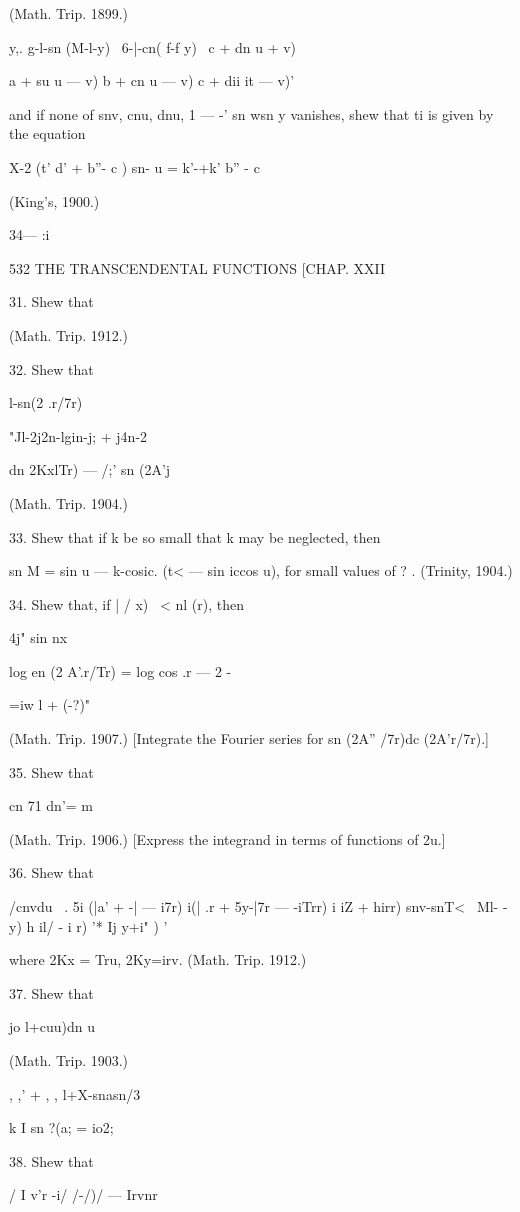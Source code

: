 (Math. Trip. 1899.)

y,. g-l-sn (M-l-y) \ 6-|-cn( f-f y) \ c + dn u + v)

a + su u — v) b + cn u — v) c + dii it — v)'

and if none of snv, cnu, dnu, 1 — -' sn wsn y vanishes, shew that ti
is given by the equation

X-2 (t' d' + b''- c ) sn- u = k'-+k' b'' - c\

(King's, 1900.)

34— :i

532 THE TRANSCENDENTAL FUNCTIONS [CHAP. XXII

31. Shew that

(Math. Trip. 1912.)

32. Shew that

l-sn(2 .r/7r)

"Jl-2j2n-lgin-j; + j4n-2

 dn 2KxlTr) — /;' sn (2A'j

(Math. Trip. 1904.)

33. Shew that if k be so small that k may be neglected, then

sn M = sin u — k-cosic. (t< — sin iccos u), for small values of ? .
(Trinity, 1904.)

34. Shew that, if | / x) \ < nl (r), then

4j" sin nx

log en (2 A'.r/Tr) = log cos .r — 2 -

 =iw l + (-?)"

(Math. Trip. 1907.) [Integrate the Fourier series for sn (2A'' /7r)dc
(2A'r/7r).]

35. Shew that

cn 71 dn'= m

(Math. Trip. 1906.) [Express the integrand in terms of functions of
2u.]

36. Shew that

/cnvdu \ . 5i (|a' + -| — i7r) i(| .r + 5y-|7r — -iTrr) i iZ + hirr)
snv-snT<~ Ml- - y) h il/ - i r) '* Ij y+i" ) '

where 2Kx = Tru, 2Ky=irv. (Math. Trip. 1912.)

37. Shew that

  jo l+cuu)dn u

(Math. Trip. 1903.)

, ,' + , , l+X-snasn/3

k I sn ?(a; = io2;

38. Shew that

/ I v'r -i/ /-/)/ — Irvnr

